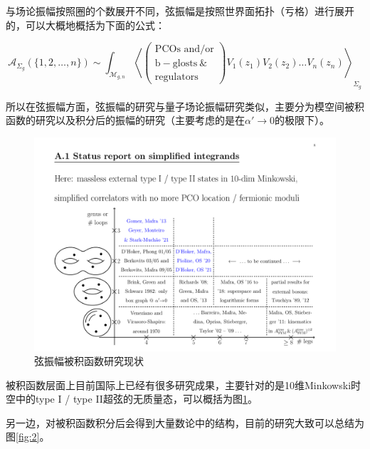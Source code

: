 \documentclass[type = bachelor]{whu-proposal}  %
\begin{document}
与场论振幅按照圈的个数展开不同，弦振幅是按照世界面拓扑（亏格）进行展开的，可以大概地概括为下面的公式：

\begin{equation}
	\mathcal{A}_{\Sigma_g}(\{1,2,\ldots,n\})\sim\int_{\mathcal{M}_{g,n}}\left\langle \left(\begin{array}{c}\text{PCOs and/or}\\\mathrm{b-glosts~\&}\\\text{regulators}\end{array}\right)V_1(z_1)V_2(z_2)\ldots V_n(z_n)\right\rangle_{\Sigma_g}
\end{equation}

所以在弦振幅方面，弦振幅的研究与量子场论振幅研究类似，主要分为模空间被积函数的研究以及积分后的振幅的研究（主要考虑的是在$\alpha'\to0$的极限下）。

\begin{figure}[H]
	\centering
	\includegraphics[width=1.0\linewidth]{figures/1.pdf}
	\caption{弦振幅被积函数研究现状}
	\label{fig:1}
\end{figure}

被积函数层面上目前国际上已经有很多研究成果，主要针对的是10维Minkowski时空中的type I / type II超弦的无质量态\cite{Mafra:2011nv,Mafra:2011nw,Geyer:2021oox,Mafra:2022wml,Berkovits:2005df,DHoker:2020tcq,DHoker:2020prr,DHoker:2001kkt}，可以概括为图\ref{fig:1}。

另一边，对被积函数积分后会得到大量数论中的结构\cite{Brown:2004ugm,Brown:2011wfj,Broedel:2017jdo}，目前的研究大致可以总结为图\ref{fig:2}。
\end{document}
